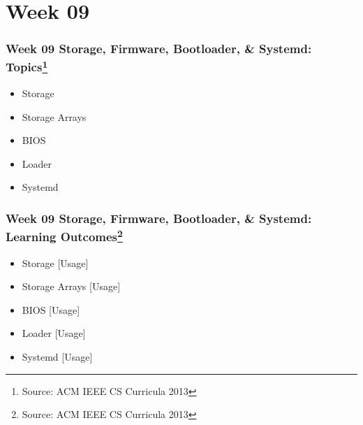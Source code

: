 
\section{Week 09}
\begin{frame}[fragile]
\frametitle{Week 09 Storage, Firmware, Bootloader, \& Systemd:
Topics\footnote{Source: ACM IEEE CS Curricula 2013}}

\begin{itemize}
\item 
Storage
\item
Storage Arrays
\item
BIOS
\item
Loader
\item
Systemd
\end{itemize}
\end{frame}

\begin{frame}[fragile]
\frametitle{Week 09 Storage, Firmware, Bootloader, \& Systemd:
Learning Outcomes\footnote{Source: ACM IEEE CS Curricula 2013}}
\begin{itemize}
\item 
Storage
[Usage]
\item
Storage Arrays
[Usage]
\item
BIOS
[Usage]
\item
Loader
[Usage]
\item
Systemd
[Usage]
\end{itemize}

\end{frame}

